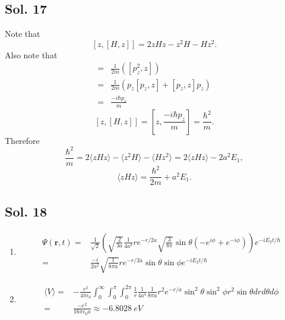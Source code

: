     \subsection*{Sol. 17}
    Note that $$
    [z,[H,z]] = 2zHz-z^2H-Hz^2.
    $$
    Also note that 
    \begin{align*}
    [H,z]=&\frac{1}{2m}([p^2_z, z])\\
    =&\frac{1}{2m}(p_z[p_z,z]+[p_z,z]p_z)\\
    =&\frac{-i\hbar p_z}{m}
    \end{align*}
    $$
    [z,[H,z]]
    =[z, \frac{-i\hbar p_z}{m}]
    =\frac{\hbar^2}{m}.
    $$
    Therefore
    $$
    \frac{\hbar^2}{m}
    =2\langle zHz\rangle
    -\langle z^2H\rangle
    -\langle Hz^2\rangle
    =2\langle zHz\rangle
    -2a^2E_1,
    $$
    $$
    \langle zHz\rangle
    =\frac{\hbar^2}{2m}+a^2E_1.
    $$


    \subsection*{Sol. 18}
    \begin{enumerate}
        \item 
        \begin{align*}
            \Psi(\bm{r},t)
            =&
            \frac{1}{\sqrt{2}}
            \left(
            \sqrt{\frac{2}{3a}}
            \frac{1}{4a^2}
            re^{-r/2a}
            \sqrt{\frac{3}{8\pi}}
            \sin\theta 
            (-e^{i\phi}+e^{-i\phi})
            \right)e^{-iE_2t/\hbar}\\
            =&
            \frac{-i}{2a^2}
            \sqrt{\frac{1}{8\pi a}}
            re^{-r/2a}
            \sin\theta 
            \sin\phi
            e^{-iE_2t/\hbar}
        \end{align*}
        \item 
        \begin{align*}
            \langle V\rangle
            =&
            -\frac{e^2}{4\pi\epsilon_0}
            \int_0^\infty 
            \int_0^\pi 
            \int_0^{2\pi}
            \frac{1}{r}
            \frac{1}{4a^4}
            \frac{1}{8\pi a}
            r^2e^{-r/a}
            \sin^2\theta 
            \sin^2\phi
            r^2\sin\theta drd\theta d\phi\\
            =&\frac{-e^2}{16\pi\epsilon_0a}\approx -\qty{6.8028}{eV}
        \end{align*}
    \end{enumerate}

